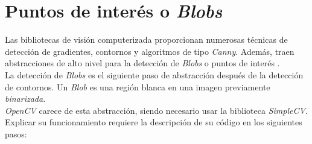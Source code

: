 \section{Puntos de interés o \emph{Blobs}}\label{tecnica:blobs}
Las bibliotecas de visión computerizada proporcionan numerosas
técnicas de detección de gradientes, contornos y algoritmos de tipo
\emph{Canny}. Además, traen abstracciones de alto nivel para la
detección de \emph{Blobs} o puntos de interés \emph{\citep*[1.7 Blob
  Detection]{simplecv_book-bib}} \emph{\citep*[5.4
  Blobs]{toennies2012guide}}.\\
La detección de \emph{Blobs} es el siguiente paso de abstracción
después de la detección de contornos. Un \emph{Blob} es una región
blanca en una imagen previamente \emph{binarizada}. \\
\emph{OpenCV} carece de esta abstracción, siendo necesario usar la
biblioteca \emph{SimpleCV}. Explicar su funcionamiento requiere la
descripción de su código en los siguientes pasos:
